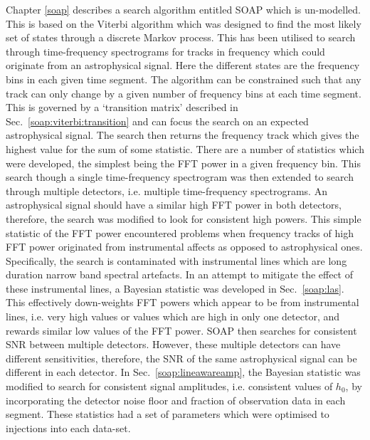 Chapter \ref{soap} describes a search algorithm entitled SOAP which is un-modelled. 
This is based on the Viterbi algorithm which was designed to find the most likely set of states through a discrete Markov process.
This has been utilised to search through time-frequency spectrograms for tracks in frequency which could originate from an astrophysical signal.
Here the different states are the frequency bins in each given time segment.
The algorithm can be constrained such that any track can only change by a given number of frequency bins at each time segment. 
This is governed by a `transition matrix' described in Sec.~\ref{soap:viterbi:transition} and can focus the search on an expected astrophysical signal.
The search then returns the frequency track which gives the highest value for the sum of some statistic.
There are a number of statistics which were developed, the simplest being the \gls{FFT} power in a given frequency bin.
This search though a single time-frequency spectrogram was then extended to search through multiple detectors, i.e. multiple time-frequency spectrograms.
An astrophysical signal should have a similar high \gls{FFT} power in both detectors, therefore, the search was modified to look for consistent high powers.
This simple statistic of the \gls{FFT} power encountered problems when frequency tracks of high \gls{FFT} power originated from instrumental affects as opposed to astrophysical ones.
Specifically, the search is contaminated with instrumental lines which are long duration narrow band spectral artefacts. 
In an attempt to mitigate the effect of these instrumental lines, a Bayesian statistic was developed in Sec.~\ref{soap:las}.
This effectively down-weights \gls{FFT} powers which appear to be from instrumental lines, i.e. very high values or values which are high in only one detector, and rewards similar low values of the \gls{FFT} power.
SOAP then searches for consistent \gls{SNR} between multiple detectors.
However, these multiple detectors can have different sensitivities, therefore, the \gls{SNR} of the same astrophysical signal can be different in each detector.
In Sec.~\ref{soap:lineawareamp}, the Bayesian statistic was modified to search for consistent signal amplitudes, i.e. consistent values of $h_0$, by incorporating the detector noise floor and fraction of observation data in each segment.
These statistics had a set of parameters which were optimised to injections into each data-set. 

